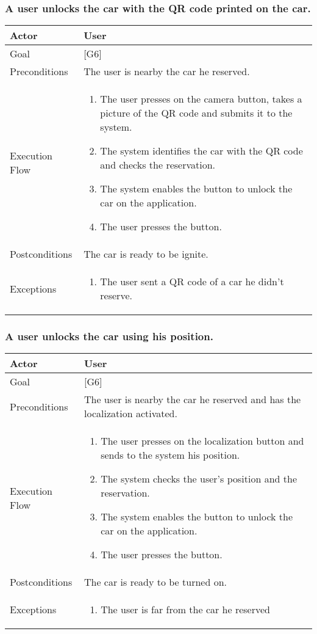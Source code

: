 \documentclass[english]{article}
\begin{document}
	\subsubsection{A user unlocks the car with the QR code printed on the car.}
	\begin{tabularx}{\textwidth}{  l  X  }
		\hline
		Actor & User\\
		\hline
		Goal & [G6]\\
		\hline
		Preconditions & The user is nearby the car he reserved.\\
		\hline
		Execution Flow & \begin{enumerate}
			\item{The user presses on the camera button, takes a picture of the QR code and submits it to the system.}
			\item{The system identifies the car with the QR code and checks the reservation.}
			\item{The system enables the button to unlock the car on the application.}
			\item{The user presses the button.}
		\end{enumerate}\\
		\hline
		Postconditions & The car is ready to be ignite.\\
		\hline
		Exceptions & \begin{enumerate}
			\item{The user sent a QR code of a car he didn't reserve.}
		\end{enumerate}\\
		\hline
	\end{tabularx}
	
	\subsubsection{A user unlocks the car using his position.}
	\begin{tabularx}{\textwidth}{  l  X  }
		\hline
		Actor & User\\
		\hline
		Goal & [G6]\\
		\hline
		Preconditions & The user is nearby the car he reserved and has the localization activated.\\
		\hline
		Execution Flow & \begin{enumerate}
			\item{The user presses on the localization button and sends to the system his position.}
			\item{The system checks the user's position and the reservation.}
			\item{The system enables the button to unlock the car on the application.}
			\item{The user presses the button.}
		\end{enumerate}\\
		\hline
		Postconditions & The car is ready to be turned on.\\
		\hline
		Exceptions & \begin{enumerate}
			\item{The user is far from the car he reserved}
		\end{enumerate}\\
		\hline
	\end{tabularx}
	
\end{document}
